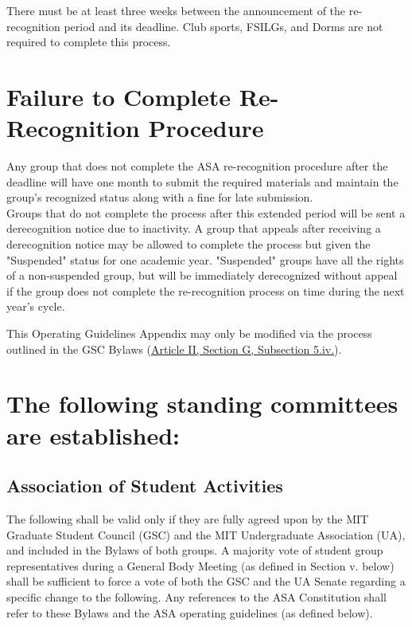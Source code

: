 \documentclass[12pt]{article}
\begin{document}
There must be at least three weeks between the announcement of the re-recognition period and its
deadline. Club sports, FSILGs, and Dorms are not required to complete this process.

\section{Failure to Complete Re-Recognition Procedure}
Any group that does not complete the ASA re-recognition procedure after the deadline will have one
month to submit the required materials and maintain the group’s recognized status along with a fine for
late submission.
\\

Groups that do not complete the process after this extended period will be sent a derecognition notice
due to inactivity. A group that appeals after receiving a derecognition notice may be allowed to complete
the process but given the "Suspended" status for one academic year. "Suspended" groups have all the
rights of a non-suspended group, but will be immediately derecognized without appeal if the group does
not complete the re-recognition process on time during the next year’s cycle.

This Operating Guidelines Appendix may only be modified via the process outlined in the GSC Bylaws %
(\hyperref[bylaws:5iv]{Article II, Section G, Subsection 5.iv.}).

\newpage

\label{app:C}

\setcounter{article}{1}

\setcounter{section}{6}
\let\secnum\Alph

\section{The following standing committees are established:}

\setcounter{subsection}{4}
\let\subsubnum\Roman
\subsection{Association of Student Activities}
The following shall be valid only if they are fully agreed upon by the MIT Graduate Student Council (GSC) and the MIT Undergraduate Association (UA), and included in the Bylaws of both groups. A majority vote of student group representatives during a General Body Meeting (as defined in Section v. below) shall be sufficient to force a vote of both the GSC and the UA Senate regarding a specific change to the following. Any references to the ASA Constitution shall refer to these Bylaws and the ASA operating guidelines (as defined below).
\end{document}
